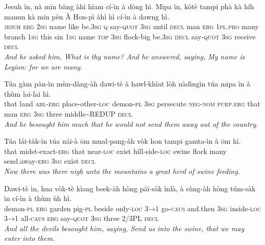 \documentclass[11pt,a4paper]{article}
\begin{document}
\begin{exe}
\gll Jesuh ìn, nà mīn bàng àhì hìam cí-ìn à dòng hì. Mipa ìn, kòtè tampi phà kà híh manun kà mīn pèn À Hon-pì àhì hì cí-ìn à dawng hì. \\
     \textsc{jesuh} \textsc{erg} \textsc{2sg} name like be.\textsc{3sg} \textsc{q} say-\textsc{quot} \textsc{3sg} until \textsc{decl} man \textsc{erg} \textsc{1pl}.\textsc{pro} many branch \textsc{1sg} this sin \textsc{1sg} name \textsc{top} \textsc{3sg} flock-big be.\textsc{3sg} \textsc{decl} say-\textsc{quot} \textsc{3sg} receive \textsc{decl} \\
\glt \textcolor{kjvcolor}{\textit{And he asked him, What is thy name? And he answered, saying, My name is Legion: for we are many.}}

\gll Túa gàm pàn-ìn mùn-dàng-àh dawi-tè à hawl-khìat lòh nàdìngìn túa mipa ìn à thùm lai-lai hì. \\
     that land \textsc{abl}-\textsc{erg} place-other-\textsc{loc} demon-\textsc{pl} \textsc{3sg} persecute \textsc{neg}-\textsc{nom} \textsc{purp}.\textsc{erg} that man \textsc{erg} \textsc{3sg} three middle\textasciitilde{}REDUP \textsc{decl} \\
\glt \textcolor{kjvcolor}{\textit{And he besought him much that he would not send them away out of the country.}}

\gll Túa lái-tàk-ìn túa nái-à ōm mual-pang-àh vòk hon tampi gamta-ìn à ōm hì. \\
     that midst-exact-\textsc{erg} that near-\textsc{loc} exist hill-side-\textsc{loc} swine flock many send.away-\textsc{erg} \textsc{3sg} exist \textsc{decl} \\
\glt \textcolor{kjvcolor}{\textit{Now there was there nigh unto the mountains a great herd of swine feeding.}}

\gll Dawi-tè ìn, hua vòk-tè kìang beek-àh hòng pái-sàk ìnlà, à sùng-àh hòng túm-sàk ìn cí-ìn à thùm ùh hì. \\
     demon-\textsc{pl} \textsc{erg} garden pig-\textsc{pl} beside only-\textsc{loc} \textsc{3→1} go-\textsc{caus} and.then \textsc{3sg} inside-\textsc{loc} \textsc{3→1} all-\textsc{caus} \textsc{erg} say-\textsc{quot} \textsc{3sg} three 2/3PL \textsc{decl} \\
\glt \textcolor{kjvcolor}{\textit{And all the devils besought him, saying, Send us into the swine, that we may enter into them.}}


\end{exe}
\end{document}
